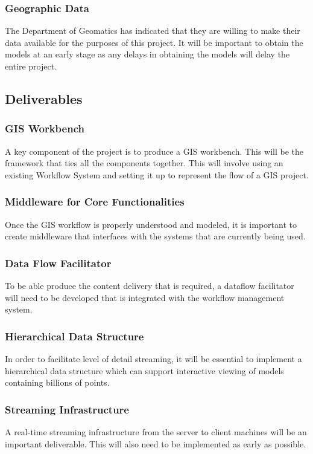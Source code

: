 \documentclass[12pt,a4paper]{article}
\begin{document}
\subsubsection*{Geographic Data}
The Department of Geomatics has indicated that they are willing to make their data
available for the purposes of this project. It will be important to obtain the
models at an early stage as any delays in obtaining the models will delay the entire project.
\subsection{Deliverables}
\subsubsection*{GIS Workbench}
A key component of the project is to produce a GIS workbench. This will
be the framework that ties all the components together. This will involve
using an existing Workflow System and setting it up to represent the
flow of a GIS project.
\subsubsection*{Middleware for Core Functionalities}
Once the GIS workflow is properly understood and modeled, it is
important to create middleware that interfaces with the systems that are
currently being used.
\subsubsection*{Data Flow Facilitator}
To be able produce the content delivery that is required, a dataflow
facilitator will need to be developed that is integrated with the
workflow management system.
\subsubsection*{Hierarchical Data Structure}
In order to facilitate level of detail streaming, it will be essential to
implement a hierarchical data structure which can support interactive
viewing of models containing billions of points.
\subsubsection*{Streaming Infrastructure}
A real-time streaming infrastructure from the server to client machines will be
an important deliverable. This will also need to be implemented as early as
possible.
\end{document}
